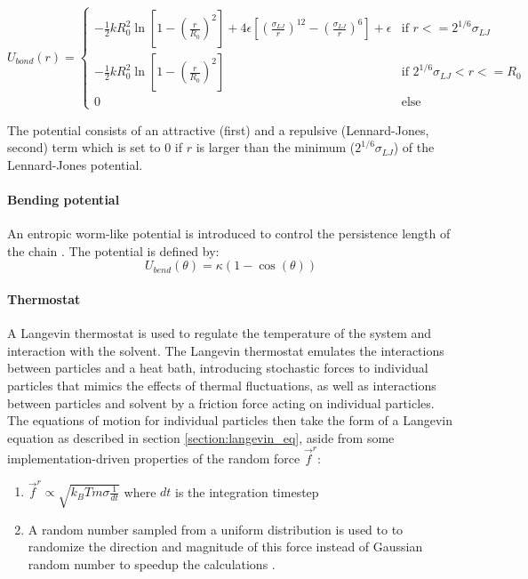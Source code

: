 \documentclass[
    paper=A4,pagesize=automedia,fontsize=12pt,
    BCOR=15mm,DIV=22,
    twoside,headinclude,footinclude=false,
    fleqn,             %
    bibliography=totocnumbered,          %
    listof=totoc,                %
    listof=flat,                 %
    cleardoublepage=empty      %
    numbers=endperiod
]{scrartcl}
\begin{document}
\begin{equation}
    U_{bond}(r) = 
    \begin{cases}
        -\frac{1}{2} k R_0^2 \ln\left[1 - \left(\frac{r}{R_0}\right)^2\right] + 4 \epsilon \left[\left(\frac{\sigma_{LJ}}{r}\right)^{12} - \left(\frac{\sigma_{LJ}}{r}\right)^6\right] + \epsilon & \text{if } r <= 2^{1/6} \sigma_{LJ} \\
        -\frac{1}{2} k R_0^2 \ln\left[1 - \left(\frac{r}{R_0}\right)^2\right] & \text{if } 2^{1/6}\sigma_{LJ} < r <= R_0\\
        0 & \text{else}
    \end{cases}
\end{equation}

The potential consists of an attractive (first) and a repulsive (Lennard-Jones, second) term which is 
set to $0$ if $r$ is larger than
the minimum ($2^{1/6}\sigma_{LJ}$) of the Lennard-Jones potential.

\paragraph{Bending potential}
\label{par:bend_potential}
An entropic worm-like potential \cite{svaneborg_2020} is introduced to control the persistence length of the chain \cite{svaneborg_2020}.
The potential is defined by:
\begin{equation} \label{eq:angle_potential}
    U_{bend}(\theta) = \kappa (1 - \cos(\theta))
\end{equation}

\paragraph{Thermostat}
A Langevin thermostat is used to regulate the temperature of the system and interaction with the solvent.
The Langevin thermostat emulates the interactions between particles and a heat bath, 
introducing stochastic forces to individual particles that mimics the effects of thermal fluctuations,
as well as interactions between particles and solvent by a friction force acting on individual particles.
The equations of motion for individual particles then take the form of a Langevin equation as described
in section \ref{section:langevin_eq}, aside from some implementation-driven properties of the random force $\vec{f}^r$:
\begin{enumerate}
    \item $\vec{f}^r \propto \sqrt{k_B T m \sigma \frac{1}{dt}}$ where $dt$ is the integration timestep \cite{LAMMPS}
    \item A random number sampled from a uniform distribution is used to to randomize the direction 
    and magnitude of this force instead of Gaussian random number to speedup the
    calculations \cite{LAMMPS} \cite{dunweg}.
\end{enumerate}
\end{document}
